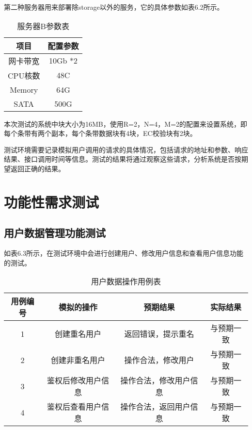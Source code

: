 第二种服务器用来部署除storage以外的服务，它的具体参数如表6.2所示。

\begin{table}[h]
    \centering
    \vspace{10pt}
    \caption{服务器B参数表}
    \vspace{-15pt}
    \begin{tabular}{cc}
      \toprule
      项目   & 配置参数   \\
      \midrule
      网卡带宽  & 10Gb *2  \\
      CPU核数   & 48C     \\
      Memory   & 64G      \\
      SATA     & 500G   \\
      \bottomrule
    \end{tabular}
\end{table}

本次测试的系统中块大小为16MB，使用R=2，N=4，M=2的配置来设置系统，即每个条带有两个副本，每个条带数据块有4块，EC校验块有2块。

测试环境需要记录模拟用户调用的请求的具体情况，包括请求的地址和参数、响应结果、接口调用时间等信息。测试的结果将通过观察这些请求，分析系统是否按期望返回正确的结果。

\section{功能性需求测试}

\subsection{用户数据管理功能测试}

如表6.3所示，在测试环境中会进行创建用户、修改用户信息和查看用户信息功能的测试。

\begin{table}[h]
  \centering
  \vspace{10pt}
  \caption{用户数据操作用例表}
  \vspace{-15pt}
  \begin{tabular}{cccc}
    \toprule
    用例编号 & 模拟的操作   & 预期结果   & 实际结果 \\
    \midrule
    1 & 创建重名用户        & 返回错误，提示重名      & 与预期一致 \\
    2 & 创建非重名用户      & 操作合法，修改用户      & 与预期一致   \\
    3 & 鉴权后修改用户信息   & 操作合法，修改用户信息  & 与预期一致    \\
    4 & 鉴权后查看用户信息   & 操作合法，返回用户信息  & 与预期一致    \\
    \bottomrule
  \end{tabular}
\end{table}


